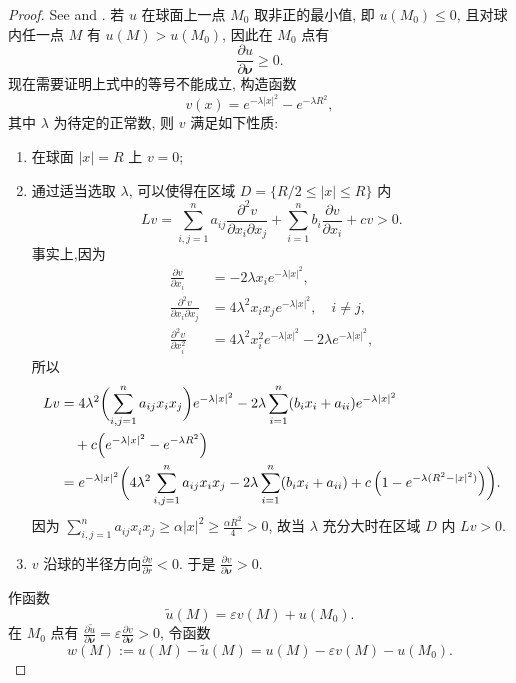 \begin{proof}
  See \cite[Hopf's Lemma in \S6.4.2]{evans_partial_2010} and \cite[Theorem~2.5 \& Corollary~2.9]{han_elliptic_2011}.
  若 $u$ 在球面上一点 $M_0$ 取非正的最小值, 即 $u(M_0)\leq 0$,
  且对球内任一点 $M$ 有 $u(M)>u(M_0)$, 因此在 $M_0$ 点有
  \[\frac{\partial u}{\partial\bm{\nu}}\geq 0.\]
  现在需要证明上式中的等号不能成立, 构造函数
  \[v(x) = e^{-\lambda|x|^2} - e^{-\lambda R^2},\]
  其中 $\lambda$ 为待定的正常数, 则 $v$ 满足如下性质:
  \begin{enumerate}[(1)]
    \item 在球面 $|x|=R$ 上 $v=0$;
    \item 通过适当选取 $\lambda$, 可以使得在区域 $D=\{ R/2 \leq |x| \leq R\}$ 内
      \[Lv = \sum_{i,j=1}^na_{ij}\frac{\partial^2v}{\partial x_i\partial x_j}
        + \sum_{i=1}^nb_i\frac{\partial v}{\partial x_i}+cv > 0.\]
      事实上,因为
      \begin{align*}
        \frac{\partial v}{\partial x_i} & = -2\lambda x_i e^{-\lambda |x|^2}, \\
        \frac{\partial^2v}{\partial x_i\partial x_j} & = 4\lambda^2 x_i x_j 
          e^{-\lambda |x|^2},\quad i\neq j, \\
        \frac{\partial^2v}{\partial x_i^2} & = 4\lambda^2 x_i^2 e^{-\lambda |x|^2}
          -2\lambda e^{-\lambda |x|^2},
      \end{align*}
      所以
      \begin{align*}
      Lv
      & = 4\lambda^2\biggl(\sum_{i,j=1}^na_{ij}x_ix_j\biggr) e^{-\lambda |x|^2}
          - 2\lambda \sum_{i=1}^n (b_ix_i + a_{ii}) e^{-\lambda |x|^2} \\
      & \quad + c \Bigl(e^{-\lambda |x|^2} - e^{-\lambda R^2}\Bigr) \\
      & = e^{-\lambda |x|^2} \biggl( 4\lambda^2\sum_{i,j=1}^n a_{ij} x_i x_j
          - 2\lambda\sum_{i=1}^n (b_i x_i + a_{ii}) + c \left(1 - e^{-\lambda(R^2-|x|^2)}\right)\biggr).
      \end{align*}
      因为 $\sum_{i,j=1}^n a_{ij} x_i x_j \geq \alpha |x|^2 \geq \frac{\alpha R^2}{4} > 0$,
      故当 $\lambda$ 充分大时在区域 $D$ 内 $Lv > 0$.
    \item $v$ 沿球的半径方向$\frac{\partial v}{\partial r}<0$.
        于是 $\frac{\partial v}{\partial\bm{\nu}} > 0$.
  \end{enumerate}
  \medskip
  作函数
  \[\tilde{u}(M)=\varepsilon v(M)+u(M_0).\]
  在 $M_0$ 点有 $\frac{\partial\tilde{u}}{\partial\bm{\nu}}
  = \varepsilon\frac{\partial v}{\partial\bm{\nu}}>0$,
  令函数
  \begin{equation}\label{eq:3.14}
    w(M) := u(M)-\tilde{u}(M) = u(M)-\varepsilon v(M)-u(M_0).
  \end{equation}
  

\end{proof}
